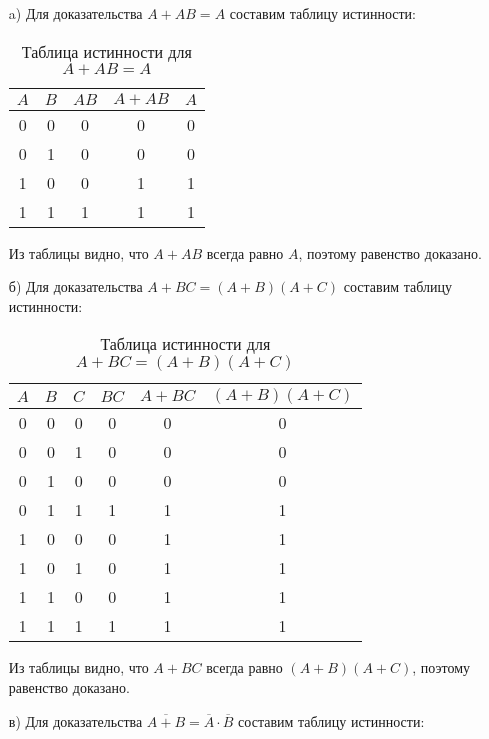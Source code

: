 \documentclass[a4paper,12pt]{article}
\begin{document}
\begin{itemize}
    \item[a)] Для доказательства \(A + AB = A\) составим таблицу истинности:

\begin{table}[h!]
\centering
\begin{tabular}{|c|c|c|c|c|}
\hline
\(A\) & \(B\) & \(AB\) & \(A + AB\) & \(A\) \\ \hline
0 & 0 & 0 & 0 & 0 \\ \hline
0 & 1 & 0 & 0 & 0 \\ \hline
1 & 0 & 0 & 1 & 1 \\ \hline
1 & 1 & 1 & 1 & 1 \\ \hline
\end{tabular}
\caption{Таблица истинности для \(A + AB = A\)}
\end{table}

Из таблицы видно, что \(A + AB\) всегда равно \(A\), поэтому равенство доказано.

\item[б)] Для доказательства \(A + BC = (A + B)(A + C)\) составим таблицу истинности:

\begin{table}[h!]
\centering
\begin{tabular}{|c|c|c|c|c|c|}
\hline
\(A\) & \(B\) & \(C\) & \(BC\) & \(A + BC\) & \((A + B)(A + C)\) \\ \hline
0 & 0 & 0 & 0 & 0 & 0 \\ \hline
0 & 0 & 1 & 0 & 0 & 0 \\ \hline
0 & 1 & 0 & 0 & 0 & 0 \\ \hline
0 & 1 & 1 & 1 & 1 & 1 \\ \hline
1 & 0 & 0 & 0 & 1 & 1 \\ \hline
1 & 0 & 1 & 0 & 1 & 1 \\ \hline
1 & 1 & 0 & 0 & 1 & 1 \\ \hline
1 & 1 & 1 & 1 & 1 & 1 \\ \hline
\end{tabular}
\caption{Таблица истинности для \(A + BC = (A + B)(A + C)\)}
\end{table}

Из таблицы видно, что \(A + BC\) всегда равно \((A + B)(A + C)\), поэтому равенство доказано.

\item[в)] Для доказательства \(\overline{A + B} = \overline{A} \cdot \overline{B}\) составим таблицу истинности:


\end{itemize}
\end{document}
